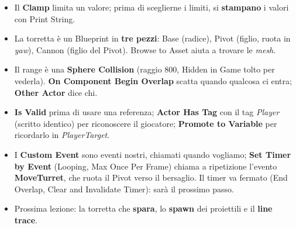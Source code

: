 \begin{itemize}
        rende il movimento graduale: Delta Time dai \emph{delta seconds}, Interp Speed
        di qualche unità, altrimenti ``snappa''.
  \item Il \textbf{Clamp} limita un valore; prima di sceglierne i limiti, si
        \textbf{stampano} i valori con Print String.
  \item La torretta è un Blueprint in \textbf{tre pezzi}: Base (radice), Pivot
        (figlio, ruota in \emph{yaw}), Cannon (figlio del Pivot). Browse to Asset aiuta
        a trovare le \emph{mesh}.
  \item Il range è una \textbf{Sphere Collision} (raggio 800, Hidden in Game tolto per
        vederla). \textbf{On Component Begin Overlap} scatta quando qualcosa ci entra;
        \textbf{Other Actor} dice chi.
  \item \textbf{Is Valid} prima di usare una referenza; \textbf{Actor Has Tag} con il tag
        \emph{Player} (scritto identico) per riconoscere il giocatore;
        \textbf{Promote to Variable} per ricordarlo in \emph{PlayerTarget}.
  \item I \textbf{Custom Event} sono eventi nostri, chiamati quando vogliamo;
        \textbf{Set Timer by Event} (Looping, Max Once Per Frame) chiama a ripetizione
        l'evento \textbf{MoveTurret}, che ruota il Pivot verso il bersaglio. Il timer
        va fermato (End Overlap, Clear and Invalidate Timer): sarà il prossimo passo.
  \item Prossima lezione: la torretta che \textbf{spara}, lo \textbf{spawn} dei
        proiettili e il \textbf{line trace}.
\end{itemize}
